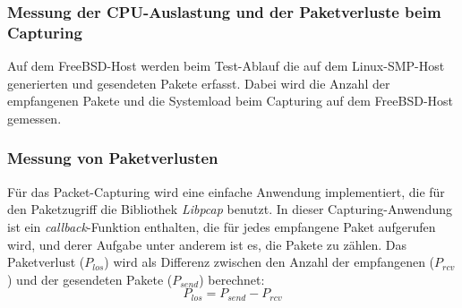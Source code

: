 \subsubsection{Messung der CPU-Auslastung und der Paketverluste beim Capturing}
Auf dem FreeBSD-Host werden beim Test-Ablauf die auf dem Linux-SMP-Host
generierten und gesendeten Pakete erfasst. Dabei wird die Anzahl der
empfangenen Pakete und die Systemload beim Capturing auf dem FreeBSD-Host
gemessen.
%
\subsubsection*{Messung von Paketverlusten}
Für das Packet-Capturing wird eine einfache Anwendung implementiert, die für den
Paketzugriff die Bibliothek \emph{Libpcap} benutzt. In dieser Capturing-Anwendung ist
ein \emph{callback}-Funktion enthalten, die für jedes empfangene Paket
aufgerufen wird, und derer Aufgabe unter anderem ist es, die Pakete zu zählen.
Das Paketverlust (\begin{math}P_{los}\end{math}) wird als Differenz zwischen 
den Anzahl der empfangenen (\begin{math}P_{rcv}\end{math}) und
der gesendeten Pakete (\begin{math}P_{send}\end{math}) berechnet:
	\begin{equation}
		P_{los} = P_{send} - P_{rcv}
		\label{equ:pktloss}
	\end{equation}
%
